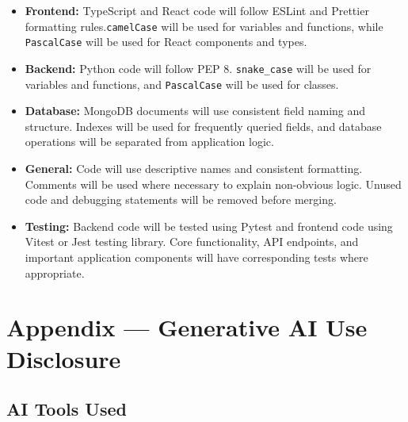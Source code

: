 \documentclass{article}
\begin{document}
\begin{itemize}
\item \textbf{Frontend:} TypeScript and React code will follow ESLint and Prettier formatting rules.\texttt{camelCase} will be used for variables and functions, while \texttt{PascalCase} will be used for React components and types.

\item \textbf{Backend:} Python code will follow PEP 8. \texttt{snake\_case} will be used for variables and functions, and \texttt{PascalCase} will be used for classes.

\item \textbf{Database:} MongoDB documents will use consistent field naming and structure. Indexes will be used for frequently queried fields, and database operations will be separated from application logic.

\item \textbf{General:} Code will use descriptive names and consistent formatting. Comments will be used where necessary to explain non-obvious logic. Unused code and debugging statements will be removed before merging.

\item \textbf{Testing:} Backend code will be tested using Pytest and frontend code using Vitest or Jest testing library. Core functionality, API endpoints, and important application components will have corresponding tests where appropriate.


\end{itemize}

\newpage{}

\newpage{}




\section{Appendix --- Generative AI Use Disclosure}



\subsection{AI Tools Used}
\end{document}
